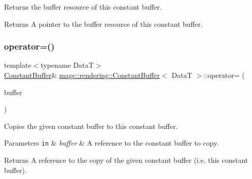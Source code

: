 Returns the buffer resource of this constant buffer.

\begin{DoxyReturn}{Returns}
A pointer to the buffer resource of this constant buffer. 
\end{DoxyReturn}
\mbox{\label{classmage_1_1rendering_1_1_constant_buffer_a8f07be2e30097690c88d4eb3338dbd5f}} 
\subsubsection{\texorpdfstring{operator=()}{operator=()}\hspace{0.1cm}{\footnotesize\ttfamily [1/2]}}
{\footnotesize\ttfamily template$<$typename DataT$>$ \\
\mbox{\hyperlink{classmage_1_1rendering_1_1_constant_buffer}{Constant\+Buffer}}\& \mbox{\hyperlink{classmage_1_1rendering_1_1_constant_buffer}{mage\+::rendering\+::\+Constant\+Buffer}}$<$ DataT $>$\+::operator= (\begin{DoxyParamCaption}\item[{const \mbox{\hyperlink{classmage_1_1rendering_1_1_constant_buffer}{Constant\+Buffer}}$<$ DataT $>$ \&}]{buffer }\end{DoxyParamCaption})\hspace{0.3cm}{\ttfamily [delete]}}

Copies the given constant buffer to this constant buffer.


\begin{DoxyParams}[1]{Parameters}
\mbox{\tt in}  & {\em buffer} & A reference to the constant buffer to copy. \\
\hline
\end{DoxyParams}
\begin{DoxyReturn}{Returns}
A reference to the copy of the given constant buffer (i.\+e. this constant buffer). 
\end{DoxyReturn}
\mbox{\label{classmage_1_1rendering_1_1_constant_buffer_a25b1945f44cfbb7fd96bc146ca76adc7}} 
